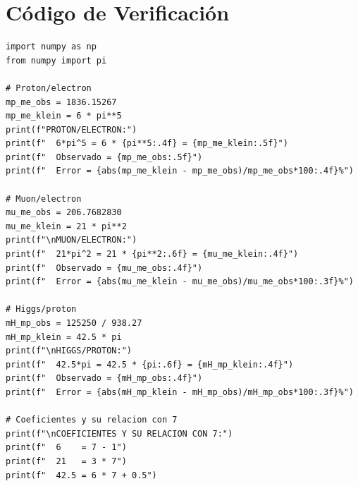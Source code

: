 \section*{Código de Verificación}

\begin{lstlisting}[caption={Verificación numérica - Capítulo 5}]
import numpy as np
from numpy import pi

# Proton/electron
mp_me_obs = 1836.15267
mp_me_klein = 6 * pi**5
print(f"PROTON/ELECTRON:")
print(f"  6*pi^5 = 6 * {pi**5:.4f} = {mp_me_klein:.5f}")
print(f"  Observado = {mp_me_obs:.5f}")
print(f"  Error = {abs(mp_me_klein - mp_me_obs)/mp_me_obs*100:.4f}%")

# Muon/electron
mu_me_obs = 206.7682830
mu_me_klein = 21 * pi**2
print(f"\nMUON/ELECTRON:")
print(f"  21*pi^2 = 21 * {pi**2:.6f} = {mu_me_klein:.4f}")
print(f"  Observado = {mu_me_obs:.4f}")
print(f"  Error = {abs(mu_me_klein - mu_me_obs)/mu_me_obs*100:.3f}%")

# Higgs/proton
mH_mp_obs = 125250 / 938.27
mH_mp_klein = 42.5 * pi
print(f"\nHIGGS/PROTON:")
print(f"  42.5*pi = 42.5 * {pi:.6f} = {mH_mp_klein:.4f}")
print(f"  Observado = {mH_mp_obs:.4f}")
print(f"  Error = {abs(mH_mp_klein - mH_mp_obs)/mH_mp_obs*100:.3f}%")

# Coeficientes y su relacion con 7
print(f"\nCOEFICIENTES Y SU RELACION CON 7:")
print(f"  6    = 7 - 1")
print(f"  21   = 3 * 7")
print(f"  42.5 = 6 * 7 + 0.5")
\end{lstlisting}
